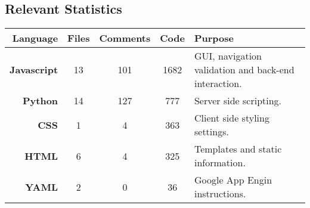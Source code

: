 \subsection{Relevant Statistics}
\begin{center}
\begin{tabular}{|r|c|c|c|l|}
\hline
\bf{Language} & \bf{Files} & \bf{Comments} & \bf{Code} & \bf{Purpose} \\
\hline 
\bf{Javascript} & 13 & 101 & 1682 & GUI, navigation validation and \newline back-end interaction. \\
\hline
\bf{Python} & 14 & 127 & 777 & Server side scripting. \\
\hline
\bf{CSS} & 1 & 4 & 363 & Client side styling settings. \\
\hline
\bf{HTML} & 6 & 4 & 325 & Templates and static information. \\
\hline
\bf{YAML} & 2 & 0 & 36 & Google App Engin instructions.\\
\hline	
\end{tabular}
\end{center}
